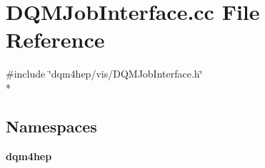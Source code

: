 \section{D\+Q\+M\+Job\+Interface.\+cc File Reference}
\label{DQMJobInterface_8cc}
{\ttfamily \#include \char`\"{}dqm4hep/vis/\+D\+Q\+M\+Job\+Interface.\+h\char`\"{}}\\*
\subsection*{Namespaces}
\begin{DoxyCompactItemize}
\item 
 {\bf dqm4hep}
\end{DoxyCompactItemize}
